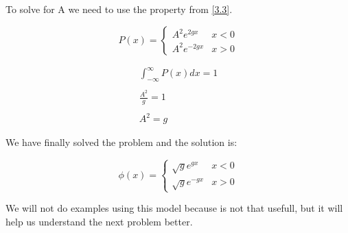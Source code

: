 To solve for A we need to use the property from \ref{3.3}.

\begin{equation}
\label{4.14}
P(x) = \left\{ \begin{array}{lc}
     A^2e^{2gx}    &  x<0  \\
     A^2e^{-2gx}   &  x>0
\end{array}\right.
\end{equation}

\begin{equation}
\label{4.15}
\begin{array}{c}
     \int_{-\infty}^{\infty}P(x) dx = 1
     \\

     \\
     \frac{A^2}{g}=1
     \\

     \\
     A^2 = g
\end{array}
\end{equation}

We have finally solved the problem and the solution is:

\begin{equation}
\label{4.16}
\phi(x) = \left\{ \begin{array}{lcc}
     \sqrt{g}e^{gx}    &  x<0  \\
     \sqrt{g}e^{-gx}   &  x>0
\end{array}\right.
\end{equation}

We will not do examples using this model because is not that usefull, but it will help us understand the next problem better.

